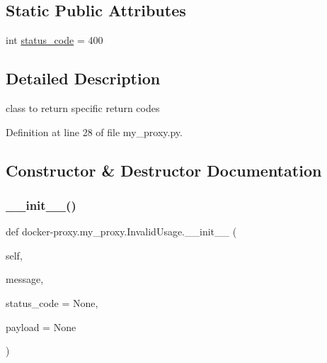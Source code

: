\subsection*{Static Public Attributes}
\begin{DoxyCompactItemize}
\item 
int \hyperlink{classdocker-proxy_1_1my__proxy_1_1_invalid_usage_aa06f3c7722ee51c93e799a0e57f67a32}{status\+\_\+code} = 400
\end{DoxyCompactItemize}


\subsection{Detailed Description}
\begin{DoxyVerb}class to return specific return codes
\end{DoxyVerb}
 

Definition at line 28 of file my\+\_\+proxy.\+py.



\subsection{Constructor \& Destructor Documentation}
\hypertarget{classdocker-proxy_1_1my__proxy_1_1_invalid_usage_aa785dfd5e9946eb87e2a94d4544bc656}{}\label{classdocker-proxy_1_1my__proxy_1_1_invalid_usage_aa785dfd5e9946eb87e2a94d4544bc656} 
\subsubsection{\texorpdfstring{\+\_\+\+\_\+init\+\_\+\+\_\+()}{\_\_init\_\_()}}
{\footnotesize\ttfamily def docker-\/proxy.\+my\+\_\+proxy.\+Invalid\+Usage.\+\_\+\+\_\+init\+\_\+\+\_\+ (\begin{DoxyParamCaption}\item[{}]{self,  }\item[{}]{message,  }\item[{}]{status\+\_\+code = {\ttfamily None},  }\item[{}]{payload = {\ttfamily None} }\end{DoxyParamCaption})}




